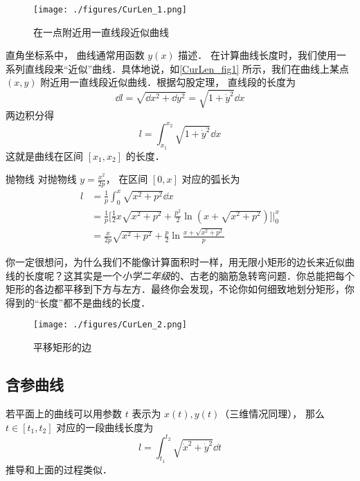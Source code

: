 
\begin{figure}[ht]
\centering
\texttt{[image: ./figures/CurLen\_1.png]}
\caption{在一点附近用一直线段近似曲线} \label{CurLen_fig1}
\end{figure}

直角坐标系中， 曲线通常用函数 $y(x)$ 描述． 在计算曲线长度时，我们使用一系列直线段来“近似”曲线．具体地说，如\autoref{CurLen_fig1} 所示，我们在曲线上某点 $(x, y)$ 附近用一直线段近似曲线．根据勾股定理， 直线段的长度为
\begin{equation}
\dd{l} = \sqrt{\dd{x}^2 + \dd{y}^2} = \sqrt{1 + \dot y^2} \dd{x}
\end{equation}
两边积分得
\begin{equation}\label{CurLen_eq1}
l = \int_{x_1}^{x_2} \sqrt{1 + \dot y^2} \dd{x}
\end{equation}
这就是曲线在区间 $[x_1, x_2]$ 的长度．

\begin{example}{抛物线}
对抛物线 $y=\frac{x^2}{2p}$， 在区间 $[0,x]$ 对应的弧长为
\begin{equation}
\begin{aligned}
l& = \frac{1}{p}\int_{0}^{x}\sqrt{x^2+p^2}\dd{x}\\
&=\frac{1}{p}\bigg[\frac{1}{2}x\sqrt{x^2+p^2}+\frac{p^2}{2}\ln(x+\sqrt{x^2+p^2})\bigg]\Bigg\lvert_{0}^{x}\\
&=\frac{x}{2p}\sqrt{x^2+p^2}+\frac{p}{2}\ln\frac{x+\sqrt{x^2+p^2}}{p}
\end{aligned}
\end{equation}
\end{example}

你一定很想问，为什么我们不能像计算面积时一样，用无限小矩形的边长来近似曲线的长度呢？这其实是一个\textsl{小学二年级}的、古老的脑筋急转弯问题．你总能把每个矩形的各边都平移到下方与左方．最终你会发现，不论你如何细致地划分矩形，你得到的“长度”都不是曲线的长度．
\begin{figure}[ht]
\centering
\texttt{[image: ./figures/CurLen\_2.png]}
\caption{平移矩形的边} \label{CurLen_fig2}
\end{figure}

\subsection{含参曲线}
若平面上的曲线可以用参数 $t$ 表示为 $x(t), y(t)$（三维情况同理）， 那么 $t \in [t_1, t_2]$ 对应的一段曲线长度为
\begin{equation}\label{CurLen_eq2}
l = \int_{t_1}^{t_2} \sqrt{\dot x^2 + \dot y^2} \dd{t}
\end{equation}
推导和上面的过程类似．

